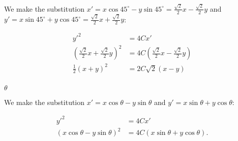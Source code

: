 \documentclass[../gatm_answers.tex]{subfiles}
\begin{document}
We make the substitution $x'=x \cos 45^\circ - y\sin 45^\circ=\frac{\sqrt{2}}{2}x-\frac{\sqrt{2}}{2}y$ and $y'=x\sin 45^\circ + y\cos 45^\circ=\frac{\sqrt{2}}{2}x+\frac{\sqrt{2}}{2}y$:

\begin{align*}
y'^2&=4Cx' \\
\left(\frac{\sqrt{2}}{2}x+\frac{\sqrt{2}}{2}y\right)^2 &= 4C\left(\frac{\sqrt{2}}{2}x-\frac{\sqrt{2}}{2}y\right) \\
\frac{1}{2}(x+y)^2 &= 2C\sqrt{2}(x-y) \\
\end{align*}

\begin{iinner_problem}
\item $\theta$
\end{iinner_problem}

We make the substitution $x'=x \cos \theta - y\sin \theta$ and $y'=x\sin \theta + y\cos \theta$:

\begin{align*}
y'^2&=4Cx' \\
\left(x \cos \theta - y\sin \theta\right)^2 &= 4C\left(x\sin \theta + y\cos \theta\right).
\end{align*}
\end{document}
